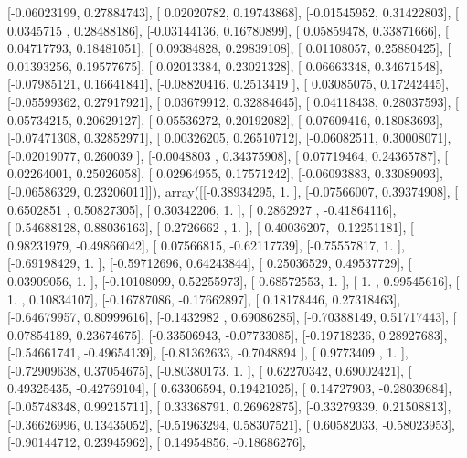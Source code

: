 \documentclass{article}
\begin{document}
       [-0.06023199,  0.27884743],
       [ 0.02020782,  0.19743868],
       [-0.01545952,  0.31422803],
       [ 0.0345715 ,  0.28488186],
       [-0.03144136,  0.16780899],
       [ 0.05859478,  0.33871666],
       [ 0.04717793,  0.18481051],
       [ 0.09384828,  0.29839108],
       [ 0.01108057,  0.25880425],
       [ 0.01393256,  0.19577675],
       [ 0.02013384,  0.23021328],
       [ 0.06663348,  0.34671548],
       [-0.07985121,  0.16641841],
       [-0.08820416,  0.2513419 ],
       [ 0.03085075,  0.17242445],
       [-0.05599362,  0.27917921],
       [ 0.03679912,  0.32884645],
       [ 0.04118438,  0.28037593],
       [ 0.05734215,  0.20629127],
       [-0.05536272,  0.20192082],
       [-0.07609416,  0.18083693],
       [-0.07471308,  0.32852971],
       [ 0.00326205,  0.26510712],
       [-0.06082511,  0.30008071],
       [-0.02019077,  0.260039  ],
       [-0.0048803 ,  0.34375908],
       [ 0.07719464,  0.24365787],
       [ 0.02264001,  0.25026058],
       [ 0.02964955,  0.17571242],
       [-0.06093883,  0.33089093],
       [-0.06586329,  0.23206011]]), array([[-0.38934295,  1.        ],
       [-0.07566007,  0.39374908],
       [ 0.6502851 ,  0.50827305],
       [ 0.30342206,  1.        ],
       [ 0.2862927 , -0.41864116],
       [-0.54688128,  0.88036163],
       [ 0.2726662 ,  1.        ],
       [-0.40036207, -0.12251181],
       [ 0.98231979, -0.49866042],
       [ 0.07566815, -0.62117739],
       [-0.75557817,  1.        ],
       [-0.69198429,  1.        ],
       [-0.59712696,  0.64243844],
       [ 0.25036529,  0.49537729],
       [ 0.03909056,  1.        ],
       [-0.10108099,  0.52255973],
       [ 0.68572553,  1.        ],
       [ 1.        ,  0.99545616],
       [ 1.        ,  0.10834107],
       [-0.16787086, -0.17662897],
       [ 0.18178446,  0.27318463],
       [-0.64679957,  0.80999616],
       [-0.1432982 ,  0.69086285],
       [-0.70388149,  0.51717443],
       [ 0.07854189,  0.23674675],
       [-0.33506943, -0.07733085],
       [-0.19718236,  0.28927683],
       [-0.54661741, -0.49654139],
       [-0.81362633, -0.7048894 ],
       [ 0.9773409 ,  1.        ],
       [-0.72909638,  0.37054675],
       [-0.80380173,  1.        ],
       [ 0.62270342,  0.69002421],
       [ 0.49325435, -0.42769104],
       [ 0.63306594,  0.19421025],
       [ 0.14727903, -0.28039684],
       [-0.05748348,  0.99215711],
       [ 0.33368791,  0.26962875],
       [-0.33279339,  0.21508813],
       [-0.36626996,  0.13435052],
       [-0.51963294,  0.58307521],
       [ 0.60582033, -0.58023953],
       [-0.90144712,  0.23945962],
       [ 0.14954856, -0.18686276],
\end{document}
